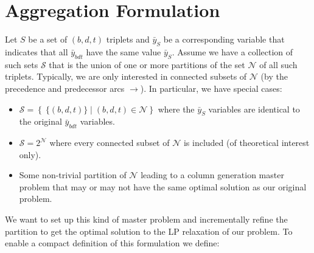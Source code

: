 \documentclass[authoryear,11pt,square,number,times,super,comma]{elsarticle}
\def\by{\bar{y}}
\begin{document}
\section{Aggregation Formulation}\label{sec:agg}
Let $S$ be a set of $(b,d,t)$ triplets and $\by_{S}$ be a corresponding
variable that indicates that all $\by_{bdt}$ have the same value $\by_S$.
Assume we have a collection of such sets $\mathcal{S}$ that is the union of
one or more partitions of the set $\mathcal{N}$ of all such triplets.
Typically, we are only interested in connected subsets of $\mathcal{N}$ (by the
precedence and predecessor arcs $\rightarrow$). In particular, we have special cases:
\begin{itemize}
\item $\mathcal{S}=\left\{\ \{(b,d,t)\} \mid (b,d,t)\in \mathcal{N}\right\}$ where the
  $\by_{S}$  variables are identical to the original $\by_{bdt}$ variables.
\item $\mathcal{S}=2^{\mathcal{N}}$ where every connected subset of
  $\mathcal{N}$ is included (of theoretical interest only).
\item Some non-trivial partition of $\mathcal{N}$ leading to a column
  generation master problem that may or may not have the same optimal solution
  as our original problem. 
\end{itemize}
We want to set up this kind of master problem and incrementally refine the
partition to get the optimal solution to the LP relaxation of our problem.
To enable a compact definition of this formulation we define:
\end{document}
